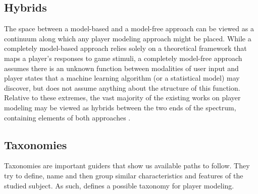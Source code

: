 \subsection{Hybrids}
The space between a model-based and a model-free approach can be viewed as a continuum along which any player modeling approach might be placed. While a completely model-based approach relies solely on a theoretical framework that maps a player’s responses to game stimuli, a completely model-free approach assumes there is an unknown function between modalities of user input and player states that a machine learning algorithm (or a statistical model) may discover, but does not assume anything about the structure of this function. Relative to these extremes, the vast majority of the existing works on player modeling may be viewed as hybrids between the two ends of the spectrum, containing elements of both approaches \citep{YannakakisPlayerModeling2013}.

\subsection{Taxonomies}

Taxonomies are important guiders that show us available paths to follow. They try to define, name and then group similar characteristics and features of the studied subject. As such, \citep{MachadoPlayermodelingcommon2011} defines a possible taxonomy for player modeling.

\begin{table}[htb]
	\centering
	\caption{Player Modeling Taxonomy Summary by \citep{MachadoPlayermodelingcommon2011}}
	\label{table: Taxonomy 1}
\end{table}

